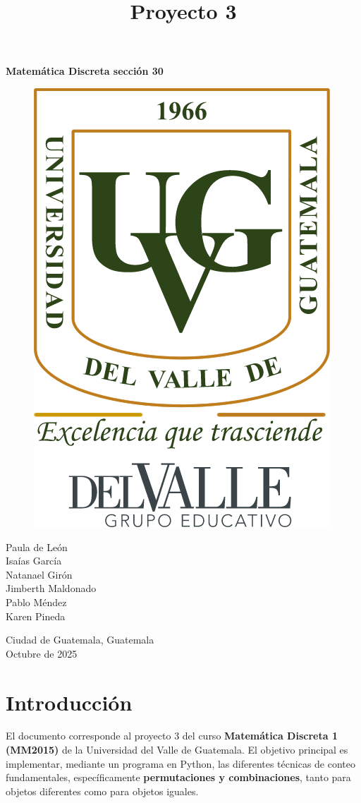\documentclass[12pt]{article}
\title{Proyecto 3}
\date{}
\begin{document}
\maketitle

\begin{center}
    \textbf{Matemática Discreta sección 30}
\end{center}

\begin{figure}[H]
    \centering
    \includegraphics[width=0.55\linewidth]{Logo.png}
    \label{fig:placeholder}
\end{figure}

\begin{center}
    Paula de León \\
    Isaías García \\
    Natanael Girón \\
    Jimberth Maldonado \\
    Pablo Méndez \\
    Karen Pineda
\end{center}

\begin{center}
    Ciudad de Guatemala, Guatemala \\
    Octubre de 2025
    
\end{center}

\newpage

\tableofcontents
\newpage

\section{Introducción}
El documento corresponde al proyecto 3 del curso \textbf{Matemática Discreta 1 (MM2015)} de la Universidad del Valle de Guatemala. 
El objetivo principal es implementar, mediante un programa en Python, las diferentes técnicas de conteo fundamentales, específicamente 
\textbf{permutaciones y combinaciones}, tanto para objetos diferentes como para objetos iguales.
\end{document}
